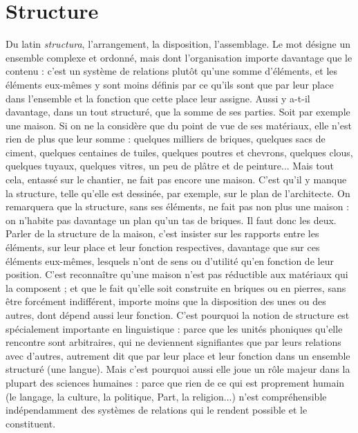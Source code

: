 \section{Structure}
Du latin {\it structura}, l’arrangement, la disposition, l’assemblage.
Le mot désigne un ensemble complexe et ordonné, mais dont
l’organisation importe davantage que le contenu : c’est un système de relations
plutôt qu’une somme d’éléments, et les éléments eux-mêmes y sont moins
définis par ce qu’ils sont que par leur place dans l’ensemble et la fonction que
cette place leur assigne. Aussi y a-t-il davantage, dans un tout structuré, que la
somme de ses parties. Soit par exemple une maison. Si on ne la considère que
du point de vue de ses matériaux, elle n’est rien de plus que leur somme :
quelques milliers de briques, quelques sacs de ciment, quelques centaines de
tuiles, quelques poutres et chevrons, quelques clous, quelques tuyaux, quelques
vitres, un peu de plâtre et de peinture... Mais tout cela, entassé sur le chantier,
ne fait pas encore une maison. C’est qu’il y manque la structure, telle qu’elle est
dessinée, par exemple, sur le plan de l’architecte. On remarquera que la structure,
sans ses éléments, ne fait pas non plus une maison : on n’habite pas
davantage un plan qu’un tas de briques. Il faut donc les deux. Parler de la structure
de la maison, c’est insister sur les rapports entre les éléments, sur leur place
et leur fonction respectives, davantage que sur ces éléments eux-mêmes, lesquels
n’ont de sens ou d'utilité qu’en fonction de leur position. C’est reconnaître
qu’une maison n’est pas réductible aux matériaux qui la composent ; et
que le fait qu’elle soit construite en briques ou en pierres, sans être forcément
indifférent, importe moins que la disposition des unes ou des autres, dont
dépend aussi leur fonction. C’est pourquoi la notion de structure est spécialement
importante en linguistique : parce que les unités phoniques qu’elle rencontre
sont arbitraires, qui ne deviennent signifiantes que par leurs relations
avec d’autres, autrement dit que par leur place et leur fonction dans un
ensemble structuré (une langue). Mais c’est pourquoi aussi elle joue un rôle
majeur dans la plupart des sciences humaines : parce que rien de ce qui est proprement
humain (le langage, la culture, la politique, Part, la religion...) n’est
compréhensible indépendamment des systèmes de relations qui le rendent possible
et le constituent.

